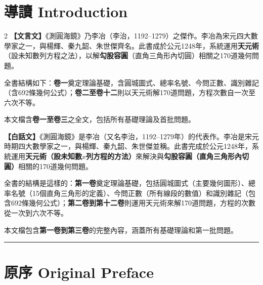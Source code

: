 \documentclass[11pt,a4paper]{article}
\begin{document}
\section{導讀 Introduction}
\label{sec:intro}

\begin{paracol}{2}
\textbf{【文言文】}《測圓海鏡》乃李冶（李治，1192--1279）之傑作。李冶為宋元四大數學家之一，與楊輝、秦九韶、朱世傑齊名。此書成於公元1248年，系統運用\textbf{天元術}（設未知數列方程之法），以解\textbf{勾股容圓}（直角三角形內切圓）相關之170道幾何問題。

全書結構如下：\textbf{卷一}奠定理論基礎，含圓城圖式、總率名號、今問正數、識別雜記（含692條幾何公式）；\textbf{卷二至卷十二}則以天元術解170道問題，方程次數自一次至六次不等。

本文檔含\textbf{卷一至卷三}之全文，包括所有基礎理論及首批問題。

\switchcolumn
\textbf{【白話文】}《測圓海鏡》是李冶（又名李治，1192--1279年）的代表作。李冶是宋元時期四大數學家之一，與楊輝、秦九韶、朱世傑並稱。此書完成於公元1248年，系統運用\textbf{天元術（設未知數$x$列方程的方法）}來解決與\textbf{勾股容圓（直角三角形內切圓）}相關的170道幾何問題。

全書的結構是這樣的：\textbf{第一卷}奠定理論基礎，包括圓城圖式（主要幾何圖形）、總率名號（15個直角三角形的定義）、今問正數（所有線段的數值）和識別雜記（包含692條幾何公式）；\textbf{第二卷到第十二卷}則運用天元術來解170道問題，方程的次數從一次到六次不等。

本文檔包含\textbf{第一卷到第三卷}的完整內容，涵蓋所有基礎理論和第一批問題。
\end{paracol}

\vspace{0.5cm}
\noindent\textcolor{rulecolor}{\rule{\textwidth}{0.4pt}}

\newpage
\section{原序 Original Preface}
\label{sec:preface}
\end{document}
